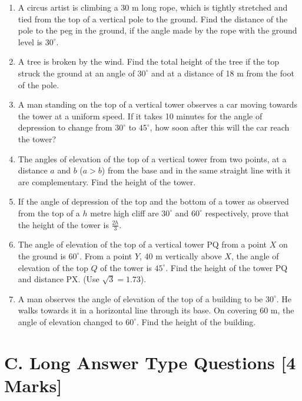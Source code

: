 \documentclass{article}
\begin{document}
\begin{enumerate}
	\item A circus artist is climbing a 30 m long rope, which is tightly stretched and tied from the top of a vertical pole to the ground. Find the distance of the pole to the peg in the ground, if the angle made by the rope with the ground level is $30^\circ$.
	
	\item A tree is broken by the wind. Find the total height of the tree if the top struck the ground at an angle of $30^\circ$ and at a distance of 18 m from the foot of the pole.
	
	\item A man standing on the top of a vertical tower observes a car moving towards the tower at a uniform speed. If it takes 10 minutes for the angle of depression to change from $30^\circ$ to $45^\circ$, how soon after this will the car reach the tower?
	
	\item The angles of elevation of the top of a vertical tower from two points, at a distance $a$ and $b$ ($a > b$) from the base and in the same straight line with it are complementary. Find the height of the tower.
	
	\item If the angle of depression of the top and the bottom of a tower as observed from the top of a $h$ metre high cliff are $30^\circ$ and $60^\circ$ respectively, prove that the height of the tower is $\frac{2h}{3}$.

	\item The angle of elevation of the top of a vertical tower PQ from a point $X$ on the ground is $60^\circ$. From a point $Y$, 40 m vertically above $X$, the angle of elevation of the top $Q$ of the tower is $45^\circ$. Find the height of the tower PQ and distance PX. (Use $\sqrt{3} = 1.73$).
	
	\item A man observes the angle of elevation of the top of a building to be $30^\circ$. He walks towards it in a horizontal line through its base. On covering 60 m, the angle of elevation changed to $60^\circ$. Find the height of the building.
\end{enumerate}

\section*{C. Long Answer Type Questions \hfill [4 Marks]}
\end{document}
